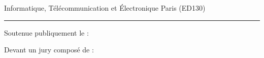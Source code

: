 \begin{titlepage}
\begin{center}
		{\Large Informatique, Télécommunication et Électronique Paris (ED130)}\\
    \end{center}
	\vfill
	\begin{flushright}
	\hfill
	\vfill
	{\LARGE\thesisTitle \par}
	\rule[5pt]{\textwidth}{.4pt} \par
	{\Large\thesisName}
	\vfill
	\end{flushright}
	Soutenue publiquement le : \textit{\large\thesisDate}
	\begin{flushleft}
		Devant un jury composé de :\\
	\end{flushleft}
\end{titlepage}
\restoregeometry
